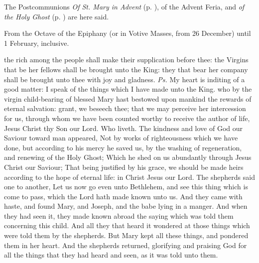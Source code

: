 \begin{rubric}
    The Postcommunions \emph{Of St. Mary in Advent} (p. \pageref{SPMaryInAdvent}), of the Advent Feria, and \emph{of the Holy Ghost} (p. \pageref{SPHolyGhost}) are here said.
\end{rubric}

\begin{rubric}
    {From the Octave of the Epiphany (or in Votive Masses, from 26 December) until 1 February, inclusive.}
\end{rubric}
\introit
{} the rich among the people shall make their supplication before thee: the Virgins that be her fellows shall be brought unto the King: they that bear her company shall be brought unto thee with joy and gladness. \textit{Ps.} My heart is inditing of a good matter: I speak of the things which I have made unto the King.
\collect
{} who by the virgin child-bearing of blessed Mary hast bestowed upon mankind the rewards of eternal salvation: grant, we beseech thee; that we may perceive her intercession for us, through whom we have been counted worthy to receive the author of life, Jesus Christ thy Son our Lord. Who liveth.
 The kindness and love of God our Saviour toward man appeared, Not by works of righteousness which we have done, but according to his mercy he saved us, by the washing of regeneration, and renewing of the Holy Ghost; Which he shed on us abundantly through Jesus Christ our Saviour; That being justified by his grace, we should be made heirs according to the hope of eternal life:
in Christ Jesus our Lord.
 The shepherds said one to another, Let us now go even unto Bethlehem, and see this thing which is come to pass, which the Lord hath made known unto us. And they came with haste, and found Mary, and Joseph, and the babe lying in a manger. And when they had seen it, they made known abroad the saying which was told them concerning this child. And all they that heard it wondered at those things which were told them by the shepherds. But Mary kept all these things, and pondered them in her heart. And the shepherds returned, glorifying and praising God for all the things that they had heard and seen, as it was told unto them.
